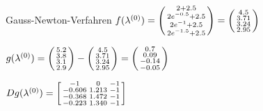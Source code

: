 \begin{example2}{Gauss-Newton-Verfahren}
$f(\lambda^{(0)}) = \begin{psmallmatrix} 2 + 2.5 \\ 2e^{-0.5} + 2.5 \\ 2e^{-1} + 2.5 \\ 2e^{-1.5} + 2.5 \end{psmallmatrix} = \begin{psmallmatrix} 4.5 \\ 3.71 \\ 3.24 \\ 2.95 \end{psmallmatrix}$

$g(\lambda^{(0)}) = \begin{psmallmatrix} 5.2 \\ 3.8 \\ 3.1 \\ 2.9 \end{psmallmatrix} - \begin{psmallmatrix} 4.5 \\ 3.71 \\ 3.24 \\ 2.95 \end{psmallmatrix} = \begin{psmallmatrix} 0.7 \\ 0.09 \\ -0.14 \\ -0.05 \end{psmallmatrix}$

$Dg(\lambda^{(0)}) = \begin{bsmallmatrix}
-1 & 0 & -1 \\
-0.606 & 1.213 & -1 \\
-0.368 & 1.472 & -1 \\
-0.223 & 1.340 & -1
\end{bsmallmatrix}$


\end{example2}
